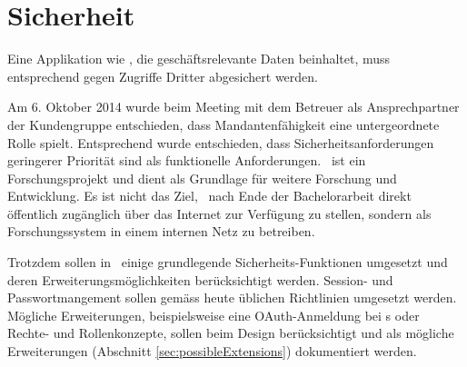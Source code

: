 \section{Sicherheit}
	Eine Applikation wie \eeppi , die geschäftsrelevante Daten beinhaltet, muss entsprechend gegen Zugriffe Dritter abgesichert werden.
	
	Am 6. Oktober 2014 wurde beim Meeting mit dem Betreuer als Ansprechpartner der Kundengruppe entschieden,
	dass Mandantenfähigkeit eine untergeordnete Rolle spielt.
	Entsprechend wurde entschieden, dass Sicherheitsanforderungen geringerer Priorität sind als funktionelle Anforderungen.
	\eeppi\ ist ein Forschungsprojekt und dient als Grundlage für weitere Forschung und Entwicklung. Es ist nicht das Ziel, \eeppi\ nach Ende der Bachelorarbeit direkt öffentlich zugänglich über das Internet zur Verfügung zu stellen, sondern als Forschungssystem in einem internen Netz zu betreiben.
	
	Trotzdem sollen in \eeppi\ einige grundlegende Sicherheits-Funktionen umgesetzt und deren Erweiterungsmöglichkeiten berücksichtigt werden.
	Session- und Passwortmangement sollen gemäss heute üblichen Richtlinien umgesetzt werden.
	Mögliche Erweiterungen, beispielsweise eine OAuth-Anmeldung bei \ppt s oder Rechte- und Rollenkonzepte, sollen beim Design berücksichtigt und als mögliche Erweiterungen (Abschnitt \ref{sec:possibleExtensions}) dokumentiert werden.
